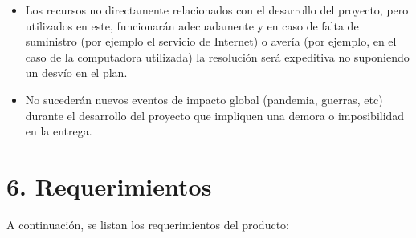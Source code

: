 \documentclass[
11pt, %
]{charter}
\begin{document}
\begin{itemize}
	\item Los recursos no directamente relacionados con el desarrollo del proyecto, pero utilizados en este, funcionarán adecuadamente y en caso de falta de suministro (por ejemplo el servicio de Internet) o avería (por ejemplo, en el caso de la computadora utilizada) la resolución será expeditiva no suponiendo un desvío en el plan.
	\item No sucederán nuevos eventos de impacto global (pandemia, guerras, etc) durante el desarrollo del proyecto que impliquen una demora o imposibilidad en la entrega. 
\end{itemize}



\section{6. Requerimientos}
\label{sec:requerimientos}

A continuación, se listan los requerimientos del producto:
\end{document}
